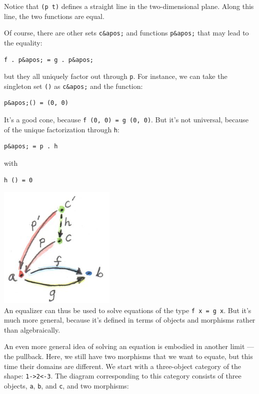 Notice that \texttt{(p\ t)} defines a straight line in the
two-dimensional plane. Along this line, the two functions are equal.

Of course, there are other sets \texttt{c\&apos;} and functions
\texttt{p\&apos;} that may lead to the equality:

\begin{verbatim}
f . p&apos; = g . p&apos;
\end{verbatim}

but they all uniquely factor out through \texttt{p}. For instance, we
can take the singleton set \texttt{()} as \texttt{c\&apos;} and the
function:

\begin{verbatim}
p&apos;() = (0, 0)
\end{verbatim}

It's a good cone, because \texttt{f\ (0,\ 0)\ =\ g\ (0,\ 0)}. But it's
not universal, because of the unique factorization through \texttt{h}:

\begin{verbatim}
p&apos; = p . h
\end{verbatim}

with

\begin{verbatim}
h () = 0
\end{verbatim}

\includegraphics[width=2.19792in]{images/equilizerlimit.jpg}\\
An equalizer can thus be used to solve equations of the type
\texttt{f\ x\ =\ g\ x}. But it's much more general, because it's defined
in terms of objects and morphisms rather than algebraically.

An even more general idea of solving an equation is embodied in another
limit --- the pullback. Here, we still have two morphisms that we want
to equate, but this time their domains are different. We start with a
three-object category of the shape:
\texttt{1-\textgreater{}2\textless{}-3}. The diagram corresponding to
this category consists of three objects, \texttt{a}, \texttt{b}, and
\texttt{c}, and two morphisms:

